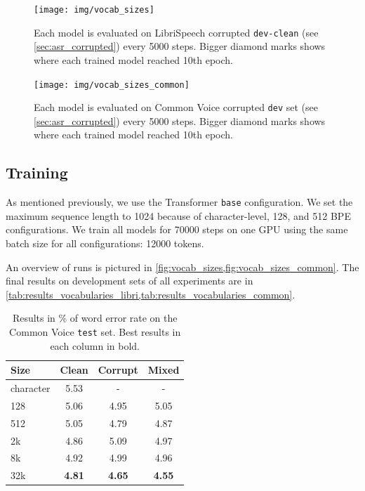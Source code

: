 \begin{figure}[p]
	\texttt{[image: img/vocab\_sizes]}
	\caption[Training captured on LibriSpeech corrupted \texttt{dev-clean}]{Each model is evaluated on LibriSpeech corrupted \texttt{dev-clean} (see \cref{sec:asr_corrupted}) every 5000 steps. Bigger diamond marks shows where each trained model reached 10th epoch.}
	\label{fig:vocab_sizes}
\end{figure}

\begin{figure}[p]
	\texttt{[image: img/vocab\_sizes\_common]}
	\caption[Training captured on Common Voice corrupted \texttt{dev} set]{Each model is evaluated on Common Voice corrupted \texttt{dev} set (see \cref{sec:asr_corrupted}) every 5000 steps. Bigger diamond marks shows where each trained model reached 10th epoch.}
	\label{fig:vocab_sizes_common}
\end{figure}


\subsection{Training}

As mentioned previously, we use the Transformer \texttt{base} configuration. We set the maximum sequence length to 1024 because of character-level, 128, and 512 BPE configurations. We train all models for 70000 steps on one GPU using the same batch size for all configurations: 12000 tokens. 

An overview of runs is pictured in \cref{fig:vocab_sizes,fig:vocab_sizes_common}. The final results on development sets of all experiments are in \cref{tab:results_vocabularies_libri,tab:results_vocabularies_common}.


\begin{table}[p]
	\centering
	\begin{tabular}{l|ccc}
		\bf Size & \bf Clean & \bf Corrupt & \bf Mixed \\
		\hline
		character    &    5.53    &    -    &    - \\
		128    &    5.06    &    4.95    &    5.05 \\
		512    &    5.05    &    4.79    &    4.87 \\
		2k    &    4.86    &    5.09    &    4.97 \\
		8k    &    4.92    &    4.99    &    4.96 \\
		32k    &    \textbf{4.81}    &    \textbf{4.65}    &    \textbf{4.55} \\
		
	\end{tabular}
	
	\caption[Results on the Common Voice \texttt{test} set]{Results in \% of word error rate on the Common Voice \texttt{test} set. Best results in each column in bold.}
	\label{tab:results_vocabularies_common_test}
\end{table}

